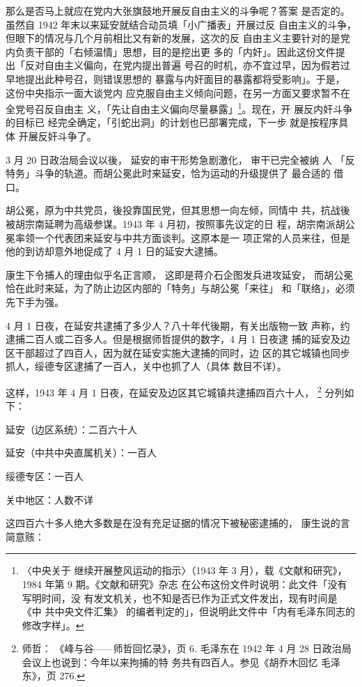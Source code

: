那么是否马上就应在党内大张旗鼓地开展反自由主义的斗争呢？答案 是否定的。
虽然自 1942 年末以来延安就结合动员填「小广播表」开展过反 自由主义的斗争，
但眼下的情况与几个月前相比又有新的发展，这次的反 自由主义主要针对的是党
内负责干部的「右倾温情」思想，目的是挖出更 多的「内奸」。因此这份文件提
出「反对自由主义偏向，在党内提出普遍 号召的时机，亦不宜过早，因为假若过
早地提出此种号召，则错误思想的 暴露与内奸面目的暴露都将受影响」。于是，
这份中央指示一面大谈党内 应克服自由主义倾向问题，在另一方面又要求暂不在
全党号召反自由主 义，「先让自由主义偏向尽量暴露」\footnote{〈中央关于
继续开展整风运动的指示〉（1943 年 3 月），载《文献和研究》，1984 年第
9 期。《文献和研究》杂志 在公布这份文件时说明：此文件「没有写明时间，没
有发文机关，也不知是否已作为正式文件发出，现有时间是《中 共中央文件汇集》
的编者判定的」，但说明此文件中「内有毛泽东同志的修改字样」。}。现在，开
展反内奸斗争的目标已 经完全确定，「引蛇出洞」的计划也已部署完成，下一步
就是按程序具体 开展反奸斗争了。

3 月 20 日政治局会议以後， 延安的审干形势急剧激化， 审干已完全被纳 人
「反特务」斗争的轨道。而胡公冕此时来延安，恰为运动的升级提供了 最合适的
借口。

胡公冕，原为中共党员，後投靠国民党，但其思想一向左倾，同情中
共，抗战後被胡宗南延聘为高级参谋。1943 年 4 月初，按照事先议定的日
程，胡宗南派胡公冕率领一个代表团来延安与中共方面谈判。这原本是一
项正常的人员来往，但是他的到访却意外地促成了 4 月 1 日的延安大逮捕。

康生下令捕人的理由似乎名正言顺，
这即是蒋介石企图发兵进攻延安，
而胡公冕恰在此时来延，为了防止边区内部的「特务」与胡公冕「来往」
和「联络」，必须先下手为强。

4 月 1 日夜，在延安共逮捕了多少人？八十年代後期，有关出版物一致
声称，约逮捕二百人或二百多人。但是根据师哲提供的数字，4 月 1 日夜逮
捕的延安及边区干部超过了四百人，因为就在延安实施大逮捕的同时，边
区的其它城镇也同步抓人，绥德专区逮捕了一百人，关中也抓了人（具体
数目不详）。

这样，1943 年 4 月 1 日夜，在延安及边区其它城镇共逮捕四百六十人，
\footnote{ 师哲： 《峰与谷——师哲回忆录》，页 6. 毛泽东在 1942 年 4 月
28 日政治局会议上也说到：今年以来拘捕的特 务共有四百人。参见《胡乔木回忆
毛泽东》，页 276.  } 分列如下：

延安（边区系统）：二百六十人

延安（中共中央直属机关）：一百人

绥德专区：一百人

关中地区：人数不详

这四百六十多人绝大多数是在没有充足证据的情况下被秘密逮捕的，
康生说的言简意赅：

